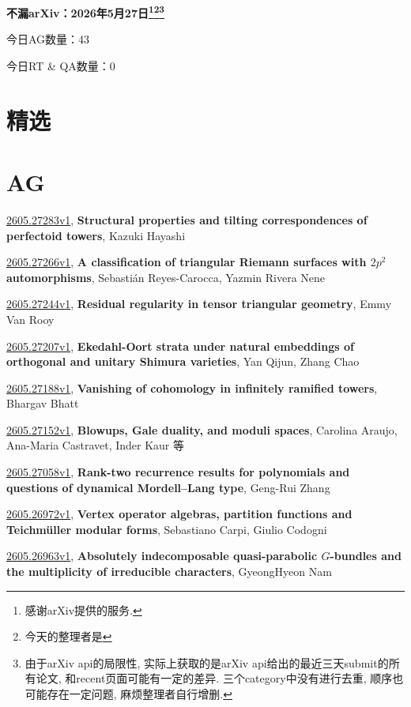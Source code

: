 \documentclass[9pt, a4paper]{article}
\theoremstyle{plain}
\theoremstyle{definition}
\theoremstyle{remark}
\newcommand{\arxiv}[3]{\href{https://arxiv.org/abs/#1}{#1}, \textbf{\textcolor{arxivblue}{#2}}, #3}
\newcommand{\AGnumber}{43}
\newcommand{\RTQAnumber}{0}
\newcommand{\NewestDate}{2026年5月27日}
\newcommand{\todayarXiver}{} %
\begin{document}
\begin{center}
    \Huge\textbf{不漏arXiv：\NewestDate\footnote{感谢arXiv提供的服务.}\footnote{今天的整理者是\todayarXiver}\footnote{由于arXiv api的局限性, 实际上获取的是arXiv api给出的最近三天submit的所有论文, 和recent页面可能有一定的差异. 三个category中没有进行去重, 顺序也可能存在一定问题, 麻烦整理者自行增删.}} \\
\end{center}

\setcounter{section}{-1}

\begin{center}
    今日AG数量：\AGnumber
    
    今日RT \& QA数量：\RTQAnumber
    
\end{center}


\section{精选}


\section{AG}
\arxiv{2605.27283v1}{Structural properties and tilting correspondences of perfectoid towers}{Kazuki Hayashi}

\arxiv{2605.27266v1}{A classification of triangular Riemann surfaces with $2p^2$ automorphisms}{Sebastián Reyes-Carocca, Yazmin Rivera Nene}

\arxiv{2605.27244v1}{Residual regularity in tensor triangular geometry}{Emmy Van Rooy}

\arxiv{2605.27207v1}{Ekedahl-Oort strata under natural embeddings of orthogonal and unitary Shimura varieties}{Yan Qijun, Zhang Chao}

\arxiv{2605.27188v1}{Vanishing of cohomology in infinitely ramified towers}{Bhargav Bhatt}

\arxiv{2605.27152v1}{Blowups, Gale duality, and moduli spaces}{Carolina Araujo, Ana-Maria Castravet, Inder Kaur 等}

\arxiv{2605.27058v1}{Rank-two recurrence results for polynomials and questions of dynamical Mordell--Lang type}{Geng-Rui Zhang}

\arxiv{2605.26972v1}{Vertex operator algebras, partition functions and Teichmüller modular forms}{Sebastiano Carpi, Giulio Codogni}

\arxiv{2605.26963v1}{Absolutely indecomposable quasi-parabolic $G$-bundles and the multiplicity of irreducible characters}{GyeongHyeon Nam}
\end{document}
